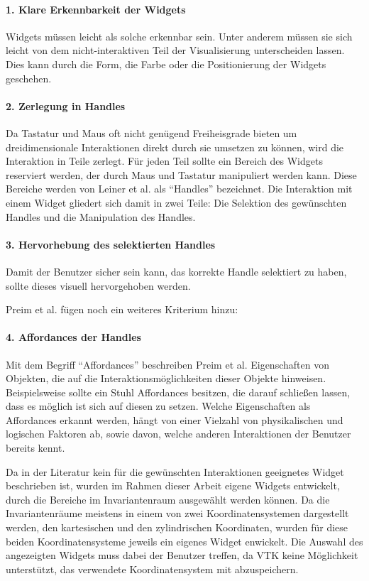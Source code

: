 \documentclass[a4paper,fontsize=12pt,toc=bib,halfparskip]{scrartcl}
\begin{document}
\paragraph{1. Klare Erkennbarkeit der Widgets}
Widgets m\"ussen leicht als solche erkennbar sein. Unter anderem m\"ussen sie sich leicht von dem nicht-interaktiven Teil der Visualisierung unterscheiden lassen. Dies kann durch die Form, die Farbe oder die Positionierung der Widgets geschehen.

\paragraph{2. Zerlegung in Handles}
Da Tastatur und Maus oft nicht gen\"ugend Freiheisgrade bieten um dreidimensionale Interaktionen direkt durch sie umsetzen zu k\"onnen, wird die Interaktion in Teile zerlegt. F\"ur jeden Teil sollte ein Bereich des Widgets reserviert werden, der durch Maus und Tastatur manipuliert werden kann. Diese Bereiche werden von Leiner et al. als ``Handles'' bezeichnet. Die Interaktion mit einem Widget gliedert sich damit in zwei Teile: Die Selektion des gew\"unschten Handles und die Manipulation des Handles.

\paragraph{3. Hervorhebung des selektierten Handles}
Damit der Benutzer sicher sein kann, das korrekte Handle selektiert zu haben, sollte dieses visuell hervorgehoben werden.

Preim et al. \cite[S.~340]{preim2015interaktive} f\"ugen noch ein weiteres Kriterium hinzu:

\paragraph{4. Affordances der Handles}
Mit dem Begriff ``Affordances'' beschreiben Preim et al. \cite[S.~137]{preim2010interaktive} Eigenschaften von Objekten, die auf die Interaktionsm\"oglichkeiten dieser Objekte hinweisen. Beispielsweise sollte ein Stuhl Affordances besitzen, die darauf schlie{\ss}en lassen, dass es m\"oglich ist sich auf diesen zu setzen. Welche Eigenschaften als Affordances erkannt werden, h\"angt von einer Vielzahl von physikalischen und logischen Faktoren ab, sowie davon, welche anderen Interaktionen der Benutzer bereits kennt.

Da in der Literatur kein f\"ur die gew\"unschten Interaktionen geeignetes Widget beschrieben ist, wurden im Rahmen dieser Arbeit eigene Widgets entwickelt, durch die Bereiche im Invariantenraum ausgew\"ahlt werden k\"onnen. Da die Invariantenr\"aume meistens in einem von zwei Koordinatensystemen dargestellt werden, den kartesischen und den zylindrischen Koordinaten, wurden f\"ur diese beiden Koordinatensysteme jeweils ein eigenes Widget enwickelt. Die Auswahl des angezeigten Widgets muss dabei der Benutzer treffen, da VTK keine M\"oglichkeit unterst\"utzt, das verwendete Koordinatensystem mit abzuspeichern.
\end{document}
